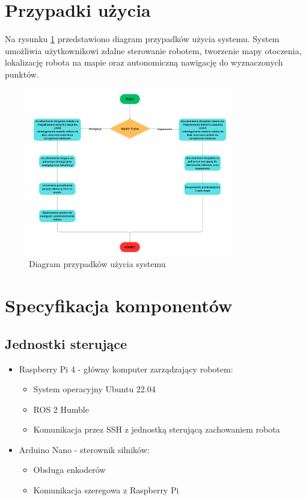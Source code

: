 \documentclass[a4paper,twoside,12pt]{book}
\begin{document}
\section{Przypadki użycia}
Na rysunku \ref{fig:use-case} przedstawiono diagram przypadków użycia systemu. System umożliwia użytkownikowi zdalne sterowanie robotem, tworzenie mapy otoczenia, lokalizację robota na mapie oraz autonomiczną nawigację do wyznaczonych punktów. 
\begin{figure}[!hb]
\centering
\includegraphics[width=0.8\textwidth]{images/UML.png}
\caption{Diagram przypadków użycia systemu}
\label{fig:use-case}
\end{figure}
\newpage
\section{Specyfikacja komponentów}
\subsection{Jednostki sterujące}
\begin{itemize}
\item Raspberry Pi 4 - główny komputer zarządzający robotem:
	\begin{itemize}
	\item System operacyjny Ubuntu 22.04
	\item ROS 2 Humble
	\item Komunikacja przez SSH z jednostką sterującą zachowaniem robota
	\end{itemize}
	
		
\item Arduino Nano - sterownik silników:
	\begin{itemize}
	\item Obsługa enkoderów
	\item Komunikacja szeregowa z Raspberry Pi
	\end{itemize}


\end{itemize}
\end{document}
